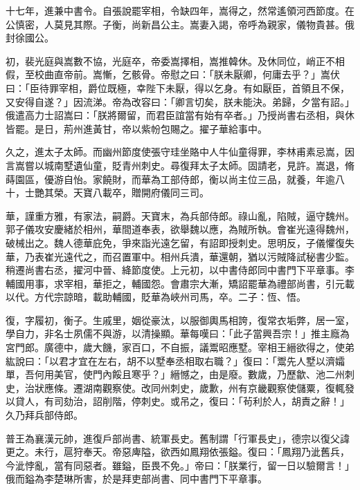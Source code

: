 \begin{pinyinscope}
 十七年，進兼中書令。自張說罷宰相，令缺四年，嵩得之，然常遙領河西節度。在公慎密，人莫見其際。子衡，尚新昌公主。嵩妻入謁，帝呼為親家，儀物貴甚。俄封徐國公。



 初，裴光庭與嵩數不協，光庭卒，帝委嵩擇相，嵩推韓休。及休同位，峭正不相假，至校曲直帝前。嵩慚，乞骸骨。帝慰之曰：「朕未厭卿，何庸去乎？」嵩伏曰：「臣待罪宰相，爵位既極，幸陛下未厭，得以乞身。有如厭臣，首領且不保，又安得自遂？」因流涕。帝為改容曰：「卿言切矣，朕未能決。弟歸，夕當有詔。」俄遣高力士詔嵩曰：「朕將爾留，而君臣誼當有始有卒者。」乃授尚書右丞相，與休皆罷。是日，荊州進黃甘，帝以紫帉包賜之。擢子華給事中。



 久之，進太子太師。而幽州節度使張守珪坐賂中人牛仙童得罪，李林甫素忌嵩，因言嵩嘗以城南墅遺仙童，貶青州刺史。尋復拜太子太師。固請老，見許。嵩退，脩蒔園區，優游自怡。家饒財，而華為工部侍郎，衡以尚主位三品，就養，年逾八十，士艷其榮。天寶八載卒，贈開府儀同三司。



 華，謹重方雅，有家法，嗣爵。天寶末，為兵部侍郎。祿山亂，陷賊，逼守魏州。郭子儀攻安慶緒於相州，華間道奉表，欲舉魏以應，為賊所執。會崔光遠得魏州，破械出之。魏人德華庇免，爭來詣光遠乞留，有詔即授刺史。思明反，子儀懼復失華，乃表崔光遠代之，而召置軍中。相州兵潰，華還朝，猶以污賊降試秘書少監。稍遷尚書右丞，擢河中晉、絳節度使。上元初，以中書侍郎同中書門下平章事。李輔國用事，求宰相，華拒之，輔國怨。會肅宗大漸，矯詔罷華為禮部尚書，引元載以代。方代宗諒暗，載助輔國，貶華為峽州司馬，卒。二子：恆、悟。



 復，字履初，衡子。生戚里，姻從豪汰，以服御輿馬相誇，復常衣垢弊，居一室，學自力，非名士夙儒不與游，以清操顯。華每嘆曰：「此子當興吾宗！」推主廕為宮門郎。廣德中，歲大饑，家百口，不自振，議鬻昭應墅。宰相王縉欲得之，使弟紘說曰：「以君才宜在左右，胡不以墅奉丞相取右職？」復曰：「鬻先人墅以濟孀單，吾何用美官，使門內餒且寒乎？」縉憾之，由是廢。數歲，乃歷歙、池二州刺史，治狀應條。遷湖南觀察使。改同州刺史，歲歉，州有京畿觀察使儲粟，復輒發以貸人，有司劾治，詔削階，停刺史。或吊之，復曰：「茍利於人，胡責之辭！」久乃拜兵部侍郎。



 普王為襄漢元帥，進復戶部尚書、統軍長史。舊制謂「行軍長史」，德宗以復父諱更之。未行，扈狩奉天。帝惡庳隘，欲西如鳳翔依張鎰。復曰：「鳳翔乃泚舊兵，今泚悖亂，當有同惡者。雖鎰，臣畏不免。」帝曰：「朕業行，留一日以驗爾言！」俄而鎰為李楚琳所害，於是拜吏部尚書、同中書門下平章事。




\end{pinyinscope}
